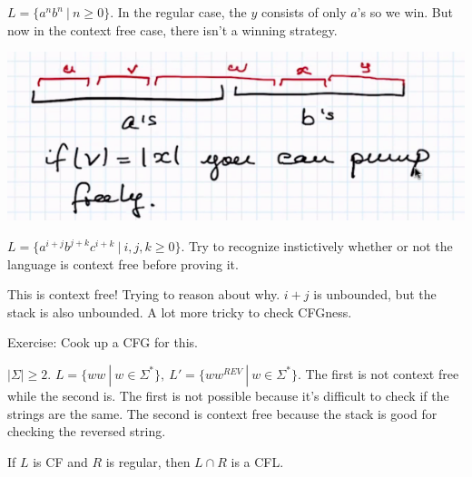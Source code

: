 \documentclass[../598comp.tex]{subfiles}
\begin{document}
\begin{example}
  $L = \{a^nb^n \ | \ n \geq 0\}$. In the regular case, the $y$ consists of only
  $a$'s so we win. But now in the context free case, there isn't a winning strategy.
  
  \includegraphics[width=\textwidth]{context_pumping_example}
\end{example}

\begin{example}
  $L = \{a^{i + j}b^{j + k}c^{i + k} \ | \ i, j, k \geq 0\}$. Try to recognize instictively whether or not the language is context free before proving it.

  This is context free! Trying to reason about why. $i + j$ is unbounded, but
  the stack is also unbounded. A lot more tricky to check CFGness.

  Exercise: Cook up a CFG for this.
\end{example}

\begin{example}
  $|\Sigma| \geq 2$. $L = \{ww \ | \ w \in \Sigma^*\}, \ L' = \{ww^{REV} \ | \ w
  \in \Sigma^*\}$. The first is not context free while the second is. The first
  is not possible because it's difficult to check if the strings are the same.
  The second is context free because the stack is good for checking the reversed string.
\end{example}

\begin{fact}
  If $L$ is CF and $R$ is regular, then $L \cap R$ is a CFL.
\end{fact}
\end{document}
